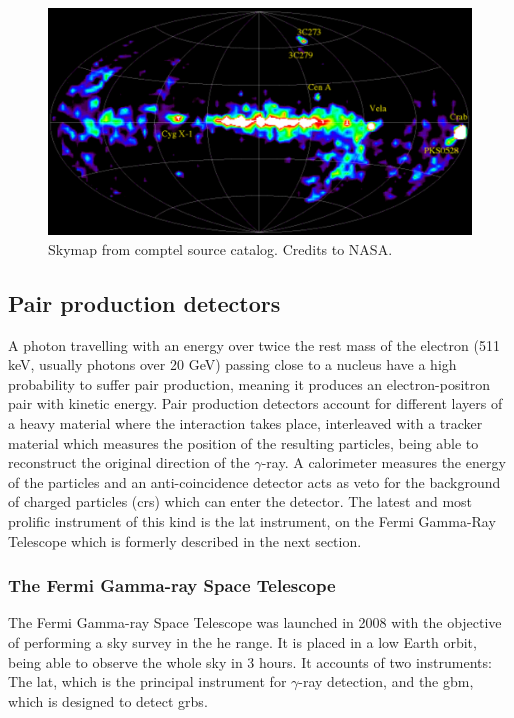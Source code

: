 \documentclass[main.tex]{subfiles}
\begin{document}
\begin{figure}
\centering
 \includegraphics[width=1\textwidth]{Pictures/comptel.pdf}
  \caption{Skymap from \gls{comptel} source catalog. Credits to NASA.}
    \label{fig:comptel}
\end{figure}

\subsection{Pair production detectors} \label{sec:pairprod}

A photon travelling with an energy over twice the rest mass of the electron (511 keV, usually photons over 20 GeV) passing close to a nucleus have a high probability to suffer pair production, meaning it produces an electron-positron pair with kinetic energy.
Pair production detectors account for different layers of a heavy material where the interaction takes place,  interleaved with a tracker material which measures the position of the resulting particles, being able to reconstruct the original direction of the $\gamma$-ray. A calorimeter measures the energy of the particles and an anti-coincidence detector acts as veto for the background of charged particles (\glspl{cr}) which can enter the detector. The latest and most prolific instrument of this kind is the \gls{lat} instrument, on the Fermi Gamma-Ray Telescope which is formerly described in the next section.

\subsubsection{The Fermi Gamma-ray Space Telescope} \label{sec:fermi}

The Fermi Gamma-ray Space Telescope was launched in 2008 with the objective of performing a sky survey in the \gls{he} range. It is placed in a low Earth orbit, being able to observe the whole sky in 3 hours. It accounts of two instruments: The \gls{lat}, which is the principal instrument for $\gamma$-ray detection, and the \gls{gbm}, which is designed to detect \glspl{grb}.\\
\end{document}
